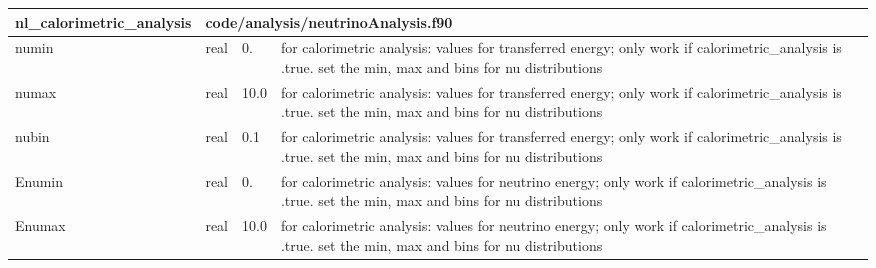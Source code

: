 \documentclass{article}
\begin{document}
\begin{longtable}{llll}
\toprule
\textbf{\large{nl\_calorimetric\_analysis}} & \multicolumn{3}{l}{\footnotesize{code/analysis/neutrinoAnalysis.f90}}\\*
\midrule
\endfirsthead
\midrule
\endhead
numin & \begin{minipage}[t]{2cm}real\end{minipage} & \begin{minipage}[t]{2cm}0.\end{minipage} & \begin{minipage}[t]{12cm}for calorimetric analysis: values for transferred energy; only work if calorimetric\_analysis is .true. set the min, max and bins for nu distributions\end{minipage}\\*
\midrule
numax & \begin{minipage}[t]{2cm}real\end{minipage} & \begin{minipage}[t]{2cm}10.0\end{minipage} & \begin{minipage}[t]{12cm}for calorimetric analysis: values for transferred energy; only work if calorimetric\_analysis is .true. set the min, max and bins for nu distributions\end{minipage}\\*
\midrule
nubin & \begin{minipage}[t]{2cm}real\end{minipage} & \begin{minipage}[t]{2cm}0.1\end{minipage} & \begin{minipage}[t]{12cm}for calorimetric analysis: values for transferred energy; only work if calorimetric\_analysis is .true. set the min, max and bins for nu distributions\end{minipage}\\*
\midrule
Enumin & \begin{minipage}[t]{2cm}real\end{minipage} & \begin{minipage}[t]{2cm}0.\end{minipage} & \begin{minipage}[t]{12cm}for calorimetric analysis: values for neutrino energy; only work if calorimetric\_analysis is .true. set the min, max and bins for nu distributions\end{minipage}\\*
\midrule
Enumax & \begin{minipage}[t]{2cm}real\end{minipage} & \begin{minipage}[t]{2cm}10.0\end{minipage} & \begin{minipage}[t]{12cm}for calorimetric analysis: values for neutrino energy; only work if calorimetric\_analysis is .true. set the min, max and bins for nu distributions\end{minipage}\\*

\end{longtable}
\end{document}
